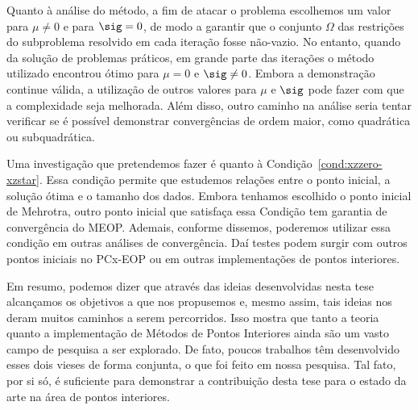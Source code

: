 Quanto à análise do método, a fim de atacar o problema escolhemos um valor para $\mu\neq 0$ e para $\sig = 0$, de modo a garantir que o conjunto $\Omega$ das restrições do subproblema resolvido em cada iteração fosse não-vazio.  No entanto, quando da solução de problemas práticos, em grande parte das iterações o método utilizado encontrou ótimo para $\mu=0$ e $\sig\neq 0$. Embora a demonstração continue válida, a utilização de outros valores para $\mu$ e $\sig$ pode fazer com que a complexidade seja melhorada. Além disso, outro caminho na análise seria tentar verificar se é possível demonstrar convergências de ordem maior, como quadrática ou subquadrática. 

Uma investigação  que pretendemos fazer é quanto à Condição~\ref{cond:xzzero-xzstar}. Essa condição permite que estudemos relações entre o ponto inicial, a solução ótima e o tamanho dos dados. Embora tenhamos escolhido o ponto inicial de Mehrotra, outro ponto inicial que satisfaça essa Condição tem garantia de convergência do MEOP. Ademais, conforme dissemos, poderemos utilizar essa condição em outras análises de convergência. Daí testes podem surgir com outros pontos iniciais no PCx-EOP ou em outras implementações de pontos interiores.



Em resumo, podemos dizer que através das ideias desenvolvidas nesta tese alcançamos os objetivos a que nos propusemos e, mesmo assim, tais ideias  nos deram muitos caminhos a serem percorridos. Isso mostra que tanto  a teoria quanto a implementação de Métodos de Pontos Interiores ainda são um vasto campo de pesquisa a ser explorado. De fato, poucos trabalhos têm desenvolvido esses dois vieses de forma conjunta, o que foi feito  em nossa pesquisa. Tal fato, por si só, é suficiente para demonstrar a contribuição desta tese para o estado da arte na área de pontos interiores. 